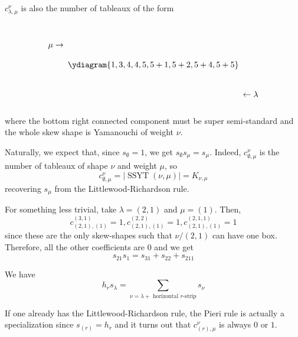 \documentclass[11pt,leqno,oneside]{amsart}
\numberwithin{thm}{section}
\newcommand{\SSYT}{\operatorname{SSYT}} %
\begin{document}
\begin{rmk}
  \(c_{\lambda,\mu}^\nu\) is also the number of tableaux of the form \[
    \begin{array}{c}
      \\ \\
      \mu \rightarrow \\
      \\ \\ \\ \\ \\ \\
    \end{array}
    \ydiagram{1,3,4,4,5,5+1,5+2,5+4,5+5}
    \begin{array}{c}
      \\ \\ \\ \\ \\ \\ \\
      \leftarrow \lambda \\
      \\
    \end{array}
  \]
  where the bottom right connected component must be super
  semi-standard and the whole skew shape is Yamanouchi of weight \(\nu\).
\end{rmk}
\begin{example}
  Naturally, we expect that, since \(s_{\emptyset} = 1\), we get
  \(s_{\emptyset} s_\mu = s_\mu\). Indeed, \(c_{\emptyset,\mu}^\nu\)
  is the number of tableaux of shape \(\nu\) and weight \(\mu\), so \[
    c_{\emptyset,\mu}^\nu = |\SSYT(\nu,\mu)| = K_{\nu,\mu}
  \]
  recovering \(s_\mu\) from the Littlewood-Richardson rule.

  For something less trivial, take \(\lambda = (2,1)\) and
  \(\mu=(1)\). Then, \[
     c_{(2,1),(1)}^{(3,1)} = 1, c_{(2,1),(1)}^{(2,2)} = 1,
     c_{(2,1),(1)}^{(2,1,1)} = 1
   \]
   since these are the only skew-shapes such that \(\nu/(2,1)\) can
   have one box. Therefore, all the other coefficients are \(0\) and
   we get \[
     s_{21} s_1 = s_{31}+s_{22}+s_{211}
   \]
\end{example}
\begin{thm}
  \label{pieri-rule} We have \[
    h_r s_\lambda = \sum_{\nu = \lambda + \text{ horizontal
      }r\text{-strip}} s_\nu
  \]
\end{thm}
\begin{rmk}
  If one already has the Littlewood-Richardson rule, the Pieri rule
  is actually a specialization since \(s_{(r)} = h_r\) and it turns
  out that \(c_{(r),\mu}^\nu\) is always \(0\) or \(1\).
\end{rmk}
\end{document}
